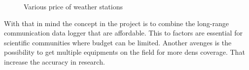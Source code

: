 \begin{figure}[H]
  \centering
  \quad
  \quad
  \quad
  \caption{Various price of weather stations}
  \label{fig:1}
\end{figure}

With that in mind the concept in the project is to combine the long-range communication data logger that are affordable. This to factors are essential for scientific communities where budget can be limited. Another avenges is the possibility to get multiple equipments on the field for more dens coverage. That increase the accuracy in research. 

